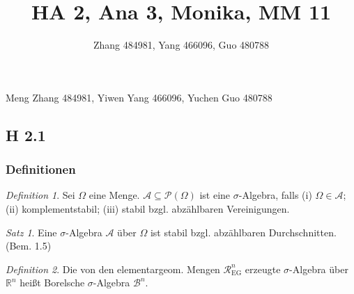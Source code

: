 \documentclass[draft,a5paper]{article}
\title{HA 2, Ana 3, Monika, MM 11}
\author{Zhang 484981, Yang 466096, Guo 480788}
\theoremstyle{remark}
\newtheorem*{Satz}{Satz}
\newtheorem*{Definition}{Definition}
\begin{document}
\maketitle
\begin{center}
  Meng Zhang 484981, Yiwen Yang 466096, Yuchen Guo 480788
\end{center}
\subsection{H 2.1}
\subsubsection{Definitionen}
\begin{Definition}
  Sei \(\Omega\) eine Menge.  \(\mathcal{A} \subseteq \mathcal{P}(\Omega)\) ist eine \(\sigma\)-Algebra,  falls (i)
  \(\Omega \in \mathcal{A}\); (ii) komplementstabil; (iii)  stabil bzgl.  abzählbaren Vereinigungen.
\end{Definition}
\begin{Satz}
  Eine \(\sigma\)-Algebra \(\mathcal{A}\) über \(\Omega\) ist stabil bzgl. abzählbaren
  Durchschnitten. (Bem. 1.5)
\end{Satz}
\begin{Definition}
  Die von den elementargeom. Mengen \(\mathcal{R}_{\mathrm{EG}}^{n}\) erzeugte
  \(\sigma\)-Algebra über \(\mathbb{R}^{n}\) heißt Borelsche \(\sigma\)-Algebra \(\mathcal{B}^{n}\).
\end{Definition}
\end{document}
